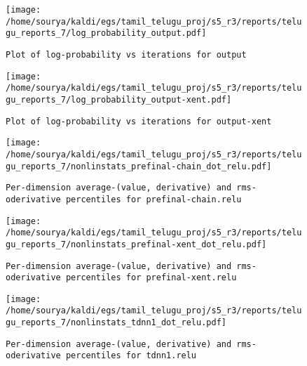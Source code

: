 \documentclass[prl,10pt,twocolumn]{revtex4}
\begin{document}
\newpage
\begin{figure}[h]
  \begin{center}
    \caption{\texttt{Plot of log-probability vs iterations for output}}
    \texttt{[image: /home/sourya/kaldi/egs/tamil\_telugu\_proj/s5\_r3/reports/telugu\_reports\_7/log\_probability\_output.pdf]}
  \end{center}
\end{figure}
\clearpage


\newpage
\begin{figure}[h]
  \begin{center}
    \caption{\texttt{Plot of log-probability vs iterations for output-xent}}
    \texttt{[image: /home/sourya/kaldi/egs/tamil\_telugu\_proj/s5\_r3/reports/telugu\_reports\_7/log\_probability\_output-xent.pdf]}
  \end{center}
\end{figure}
\clearpage


\newpage
\begin{figure}[h]
  \begin{center}
    \caption{\texttt{Per-dimension average-(value, derivative) and rms-oderivative percentiles for prefinal-chain.relu}}
    \texttt{[image: /home/sourya/kaldi/egs/tamil\_telugu\_proj/s5\_r3/reports/telugu\_reports\_7/nonlinstats\_prefinal-chain\_dot\_relu.pdf]}
  \end{center}
\end{figure}
\clearpage


\newpage
\begin{figure}[h]
  \begin{center}
    \caption{\texttt{Per-dimension average-(value, derivative) and rms-oderivative percentiles for prefinal-xent.relu}}
    \texttt{[image: /home/sourya/kaldi/egs/tamil\_telugu\_proj/s5\_r3/reports/telugu\_reports\_7/nonlinstats\_prefinal-xent\_dot\_relu.pdf]}
  \end{center}
\end{figure}
\clearpage


\newpage
\begin{figure}[h]
  \begin{center}
    \caption{\texttt{Per-dimension average-(value, derivative) and rms-oderivative percentiles for tdnn1.relu}}
    \texttt{[image: /home/sourya/kaldi/egs/tamil\_telugu\_proj/s5\_r3/reports/telugu\_reports\_7/nonlinstats\_tdnn1\_dot\_relu.pdf]}
  \end{center}
\end{figure}
\clearpage
\end{document}
